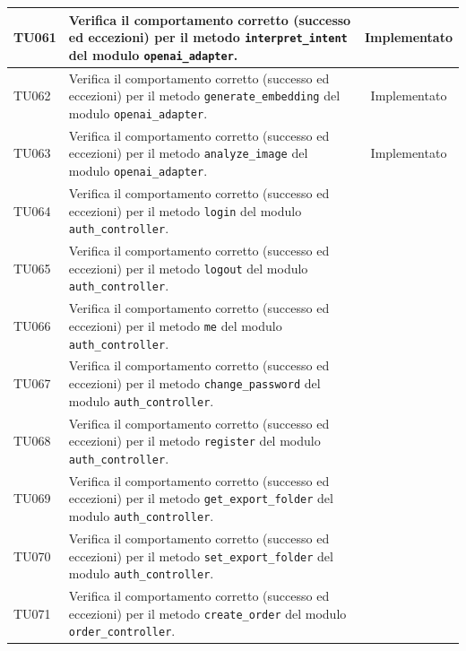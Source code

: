 \documentclass[a4paper,11pt,oneside]{scrartcl}
\begin{document}
\begin{longtable}{|p{1.9cm}|p{11.6cm}|c|}
    TU061           & Verifica il comportamento corretto (successo ed eccezioni) per il metodo \texttt{interpret\_intent} del modulo \texttt{openai\_adapter}.                     & Implementato   \\ \hline
    TU062           & Verifica il comportamento corretto (successo ed eccezioni) per il metodo \texttt{generate\_embedding} del modulo \texttt{openai\_adapter}.                   & Implementato   \\ \hline
    TU063           & Verifica il comportamento corretto (successo ed eccezioni) per il metodo \texttt{analyze\_image} del modulo \texttt{openai\_adapter}.                        & Implementato   \\ \hline
    TU064           & Verifica il comportamento corretto (successo ed eccezioni) per il metodo \texttt{login} del modulo \texttt{auth\_controller}.                                &                \\ \hline
    TU065           & Verifica il comportamento corretto (successo ed eccezioni) per il metodo \texttt{logout} del modulo \texttt{auth\_controller}.                               &                \\ \hline
    TU066           & Verifica il comportamento corretto (successo ed eccezioni) per il metodo \texttt{me} del modulo \texttt{auth\_controller}.                                   &                \\ \hline
    TU067           & Verifica il comportamento corretto (successo ed eccezioni) per il metodo \texttt{change\_password} del modulo \texttt{auth\_controller}.                     &                \\ \hline
    TU068           & Verifica il comportamento corretto (successo ed eccezioni) per il metodo \texttt{register} del modulo \texttt{auth\_controller}.                             &                \\ \hline
    TU069           & Verifica il comportamento corretto (successo ed eccezioni) per il metodo \texttt{get\_export\_folder} del modulo \texttt{auth\_controller}.                  &                \\ \hline
    TU070           & Verifica il comportamento corretto (successo ed eccezioni) per il metodo \texttt{set\_export\_folder} del modulo \texttt{auth\_controller}.                  &                \\ \hline
    TU071           & Verifica il comportamento corretto (successo ed eccezioni) per il metodo \texttt{create\_order} del modulo \texttt{order\_controller}.                       &                \\ \hline

\end{longtable}
\end{document}
